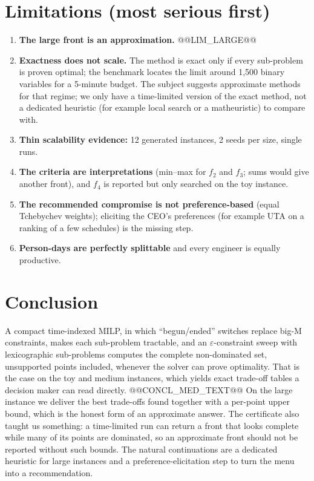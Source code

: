 \documentclass[11pt,a4paper]{article}
\theoremstyle{plain}
\newcommand{\eps}{\varepsilon}
\begin{document}
\section{Limitations (most serious first)}\label{sec:limits}

\begin{enumerate}
  \item \textbf{The large front is an approximation.} @@LIM_LARGE@@
  \item \textbf{Exactness does not scale.} The method is exact only if every sub-problem is proven optimal; the benchmark locates the limit around 1,500 binary variables for a 5-minute budget. The subject suggests approximate methods for that regime; we only have a time-limited version of the exact method, not a dedicated heuristic (for example local search or a matheuristic) to compare with.
  \item \textbf{Thin scalability evidence:} 12 generated instances, 2 seeds per size, single runs.
  \item \textbf{The criteria are interpretations} (min--max for $f_2$ and $f_3$; sums would give another front), and $f_4$ is reported but only searched on the toy instance.
  \item \textbf{The recommended compromise is not preference-based} (equal Tchebychev weights); eliciting the CEO's preferences (for example UTA on a ranking of a few schedules) is the missing step.
  \item \textbf{Person-days are perfectly splittable} and every engineer is equally productive.
\end{enumerate}

\section{Conclusion}\label{sec:conclusion}

A compact time-indexed MILP, in which ``begun/ended'' switches replace big-M constraints, makes each sub-problem tractable, and an $\eps$-constraint sweep with lexicographic sub-problems computes the complete non-dominated set, unsupported points included, whenever the solver can prove optimality.
That is the case on the toy and medium instances, which yields exact trade-off tables a decision maker can read directly. @@CONCL_MED_TEXT@@
On the large instance we deliver the best trade-offs found together with a per-point upper bound, which is the honest form of an approximate answer. The certificate also taught us something: a time-limited run can return a front that looks complete while many of its points are dominated, so an approximate front should not be reported without such bounds.
The natural continuations are a dedicated heuristic for large instances and a preference-elicitation step to turn the menu into a recommendation.
\end{document}
